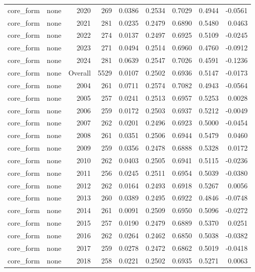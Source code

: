 \begin{table}[t]
\begin{tabular}{@{} l l r r r r r r r @{} }
      core\_form & none & 2020 & 269 & 0.0386 & 0.2534 & 0.7029 & 0.4944 & -0.0561 \\
      core\_form & none & 2021 & 281 & 0.0235 & 0.2479 & 0.6890 & 0.5480 & 0.0463 \\
      core\_form & none & 2022 & 274 & 0.0137 & 0.2497 & 0.6925 & 0.5109 & -0.0245 \\
      core\_form & none & 2023 & 271 & 0.0494 & 0.2514 & 0.6960 & 0.4760 & -0.0912 \\
      core\_form & none & 2024 & 281 & 0.0639 & 0.2547 & 0.7026 & 0.4591 & -0.1236 \\
      core\_form & none & Overall & 5529 & 0.0107 & 0.2502 & 0.6936 & 0.5147 & -0.0173 \\
      core\_form & none & 2004 & 261 & 0.0711 & 0.2574 & 0.7082 & 0.4943 & -0.0564 \\
      core\_form & none & 2005 & 257 & 0.0241 & 0.2513 & 0.6957 & 0.5253 & 0.0028 \\
      core\_form & none & 2006 & 259 & 0.0172 & 0.2503 & 0.6937 & 0.5212 & -0.0049 \\
      core\_form & none & 2007 & 262 & 0.0201 & 0.2496 & 0.6923 & 0.5000 & -0.0454 \\
      core\_form & none & 2008 & 261 & 0.0351 & 0.2506 & 0.6944 & 0.5479 & 0.0460 \\
      core\_form & none & 2009 & 259 & 0.0356 & 0.2478 & 0.6888 & 0.5328 & 0.0172 \\
      core\_form & none & 2010 & 262 & 0.0403 & 0.2505 & 0.6941 & 0.5115 & -0.0236 \\
      core\_form & none & 2011 & 256 & 0.0245 & 0.2511 & 0.6954 & 0.5039 & -0.0380 \\
      core\_form & none & 2012 & 262 & 0.0164 & 0.2493 & 0.6918 & 0.5267 & 0.0056 \\
      core\_form & none & 2013 & 260 & 0.0389 & 0.2495 & 0.6922 & 0.4846 & -0.0748 \\
      core\_form & none & 2014 & 261 & 0.0091 & 0.2509 & 0.6950 & 0.5096 & -0.0272 \\
      core\_form & none & 2015 & 257 & 0.0190 & 0.2479 & 0.6889 & 0.5370 & 0.0251 \\
      core\_form & none & 2016 & 262 & 0.0264 & 0.2462 & 0.6850 & 0.5038 & -0.0382 \\
      core\_form & none & 2017 & 259 & 0.0278 & 0.2472 & 0.6862 & 0.5019 & -0.0418 \\
      core\_form & none & 2018 & 258 & 0.0221 & 0.2502 & 0.6935 & 0.5271 & 0.0063 \\

\end{tabular}
\end{table}
